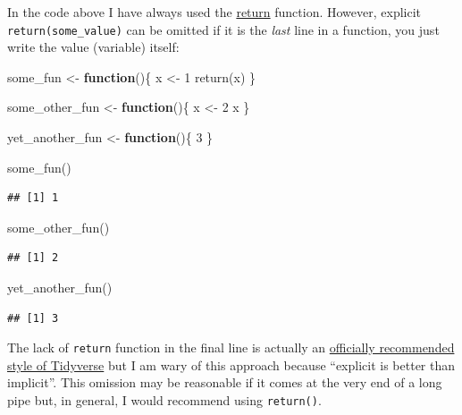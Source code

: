 \documentclass[
]{book}
\newenvironment{Shaded}{\begin{snugshade}}{\end{snugshade}}
\newcommand{\ControlFlowTok}[1]{\textcolor[rgb]{0.13,0.29,0.53}{\textbf{#1}}}
\newcommand{\DecValTok}[1]{\textcolor[rgb]{0.00,0.00,0.81}{#1}}
\newcommand{\FunctionTok}[1]{\textcolor[rgb]{0.00,0.00,0.00}{#1}}
\newcommand{\NormalTok}[1]{#1}
\newcommand{\OtherTok}[1]{\textcolor[rgb]{0.56,0.35,0.01}{#1}}
\begin{document}
In the code above I have always used the \href{https://stat.ethz.ch/R-manual/R-devel/library/base/html/function.html}{return} function. However, explicit \texttt{return(some\_value)} can be omitted if it is the \emph{last} line in a function, you just write the value (variable) itself:

\begin{Shaded}
\begin{Highlighting}[]
\NormalTok{some\_fun }\OtherTok{\textless{}{-}} \ControlFlowTok{function}\NormalTok{()\{}
\NormalTok{  x }\OtherTok{\textless{}{-}} \DecValTok{1}
  \FunctionTok{return}\NormalTok{(x)}
\NormalTok{\}}

\NormalTok{some\_other\_fun }\OtherTok{\textless{}{-}} \ControlFlowTok{function}\NormalTok{()\{}
\NormalTok{  x }\OtherTok{\textless{}{-}} \DecValTok{2}
\NormalTok{  x}
\NormalTok{\}}

\NormalTok{yet\_another\_fun }\OtherTok{\textless{}{-}} \ControlFlowTok{function}\NormalTok{()\{}
  \DecValTok{3}
\NormalTok{\}}

\FunctionTok{some\_fun}\NormalTok{()}
\end{Highlighting}
\end{Shaded}

\begin{verbatim}
## [1] 1
\end{verbatim}

\begin{Shaded}
\begin{Highlighting}[]
\FunctionTok{some\_other\_fun}\NormalTok{()}
\end{Highlighting}
\end{Shaded}

\begin{verbatim}
## [1] 2
\end{verbatim}

\begin{Shaded}
\begin{Highlighting}[]
\FunctionTok{yet\_another\_fun}\NormalTok{()}
\end{Highlighting}
\end{Shaded}

\begin{verbatim}
## [1] 3
\end{verbatim}

The lack of \texttt{return} function in the final line is actually an \href{https://style.tidyverse.org/functions.html}{officially recommended style of Tidyverse} but I am wary of this approach because ``explicit is better than implicit''. This omission may be reasonable if it comes at the very end of a long pipe but, in general, I would recommend using \texttt{return()}.
\end{document}
